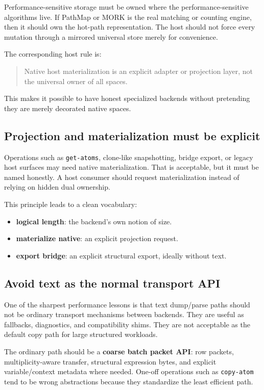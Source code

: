\documentclass[11pt]{article}
\newcommand{\code}[1]{\texttt{#1}}
\newcommand{\strong}[1]{\textbf{#1}}
\begin{document}
Performance-sensitive storage must be owned where the performance-sensitive algorithms live. If PathMap or MORK is the real matching or counting engine, then it should own the hot-path representation. The host should not force every mutation through a mirrored universal store merely for convenience.

The corresponding host rule is:

\begin{quote}
Native host materialization is an explicit adapter or projection layer, not the universal owner of all spaces.
\end{quote}

This makes it possible to have honest specialized backends without pretending they are merely decorated native spaces.

\subsection{Projection and materialization must be explicit}

Operations such as \code{get-atoms}, clone-like snapshotting, bridge export, or legacy host surfaces may need native materialization. That is acceptable, but it must be named honestly. A host consumer should request materialization instead of relying on hidden dual ownership.

This principle leads to a clean vocabulary:

\begin{itemize}
  \item \strong{logical length}: the backend's own notion of size.
  \item \strong{materialize native}: an explicit projection request.
  \item \strong{export bridge}: an explicit structural export, ideally without text.
\end{itemize}

\subsection{Avoid text as the normal transport API}

One of the sharpest performance lessons is that text dump/parse paths should not be ordinary transport mechanisms between backends. They are useful as fallbacks, diagnostics, and compatibility shims. They are not acceptable as the default copy path for large structured workloads.

The ordinary path should be a \strong{coarse batch packet API}: row packets, multiplicity-aware transfer, structural expression bytes, and explicit variable/context metadata where needed. One-off operations such as \code{copy-atom} tend to be wrong abstractions because they standardize the least efficient path.
\end{document}

